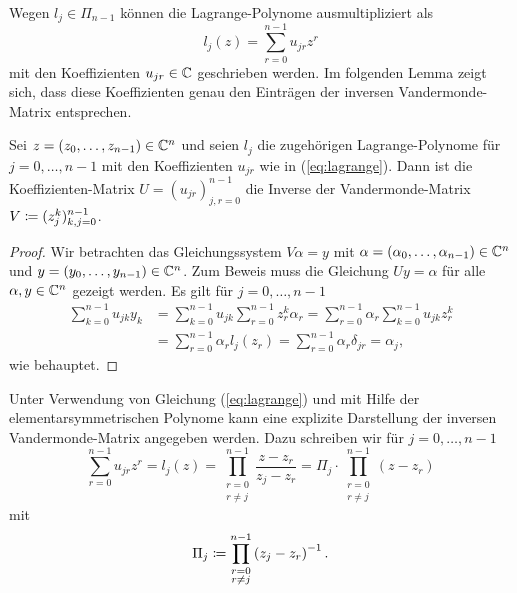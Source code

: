 \noindent Wegen $l_j \in \Pi_{n-1}$ können die Lagrange-Polynome ausmultipliziert als
\begin{equation}
    \label{eq:lagrange}
    l_j(z) = \sum_{r = 0}^{n-1} u_{jr} z^{r}
\end{equation}
mit den Koeffizienten $u_{jr} \in \mathbb{C}$ geschrieben werden.
Im folgenden Lemma zeigt sich, dass diese Koeffizienten genau den Einträgen der
inversen Vandermonde-Matrix entsprechen.
\begin{lemma}
    \label{lemma:vandermonde-inversion}
    Sei $z = (z_0, \dots, z_{n-1}) \in \mathbb{C}^n$ und seien
    $l_j$ die zugehörigen Lagrange-Polynome für $j = 0, \dots, n-1$
    mit den Koeffizienten $u_{jr}$ wie in (\ref{eq:lagrange}).
    Dann ist die Koeffizienten-Matrix $U = (u_{jr})_{j,r = 0}^{n-1}$ die
    Inverse der Vandermonde-Matrix $V \coloneqq (z_{j}^{k})_{k,j = 0}^{n-1}$.
\end{lemma}
\begin{proof}
    Wir betrachten das Gleichungssystem $V \alpha = y$ mit
    $\alpha = (\alpha_0, \dots, \alpha_{n-1}) \in \mathbb{C}^n$
    und $y = (y_0, \dots, y_{n-1}) \in \mathbb{C}^n$.
    Zum Beweis muss die Gleichung $U y = \alpha$ für alle $\alpha,  y \in \mathbb{C}^n$
    gezeigt werden.
    Es gilt für $j = 0, \dots, n-1$
    \[
        \begin{split}
            \sum_{k=0}^{n-1} u_{jk} y_k &= \sum_{k=0}^{n-1} u_{jk} \sum_{r=0}^{n-1} z_r^k \alpha_r = \sum_{r=0}^{n-1} \alpha_r \sum_{k=0}^{n-1} u_{jk} z_r^k\\
                                        &= \sum_{r=0}^{n-1} \alpha_r l_j(z_r) = \sum_{r=0}^{n-1} \alpha_r \delta_{jr} = \alpha_j,
        \end{split}
    \]
    wie behauptet.
\end{proof}

\noindent Unter Verwendung von Gleichung (\ref{eq:lagrange}) und mit Hilfe der
elementarsymmetrischen Polynome kann eine explizite Darstellung der inversen
Vandermonde-Matrix angegeben werden.
Dazu schreiben wir für $j = 0, \dots, n-1$
\begin{equation*}
    \sum_{r = 0}^{n-1} u_{jr} z^{r}
    = l_j(z)
    = \prod_{\substack{r=0\\ r \neq j}}^{n-1} \frac{z - z_r}{z_j - z_r}
    = \Pi_j \cdot \prod_{\substack{r=0\\ r \neq j}}^{n-1} \left( z - z_r \right)
\end{equation*}
mit
\begin{equation}
    \label{def:pi_j}
    \Pi_j \coloneqq \prod_{\substack{r=0\\ r \neq j}}^{n-1} \left( z_j - z_r \right)^{-1}.
\end{equation}

